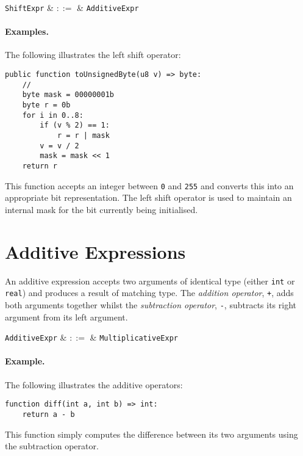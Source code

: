 \begin{syntax}
  \verb+ShiftExpr+ & $::=$ & \verb+AdditiveExpr+\ 
\end{syntax}

\paragraph{Examples.} The following illustrates the left shift operator:

\begin{lstlisting}
public function toUnsignedByte(u8 v) => byte:
    //
    byte mask = 00000001b
    byte r = 0b
    for i in 0..8:
        if (v % 2) == 1:
            r = r | mask
        v = v / 2
        mask = mask << 1
    return r
\end{lstlisting}

This function accepts an integer between \lstinline{0} and \lstinline{255} and converts this into an appropriate bit representation.  The left shift operator is used to maintain an internal mask for the bit currently being initialised.


\section{Additive Expressions}
\label{c_expr_add}

An additive expression accepts two arguments of identical type (either \lstinline{int} or \lstinline{real}) and produces a result of matching type.  The {\em addition operator}, \lstinline{+}, adds both arguments together whilst the {\em subtraction operator}, \lstinline{-}, subtracts its right argument from its left argument.

\begin{syntax}
  \verb+AdditiveExpr+ & $::=$ & \verb+MultiplicativeExpr+ \\
\end{syntax}

\paragraph{Example.}  The following illustrates the additive operators:
\begin{lstlisting}
function diff(int a, int b) => int:
    return a - b
\end{lstlisting}
This function simply computes the difference between its two arguments using the subtraction operator.


